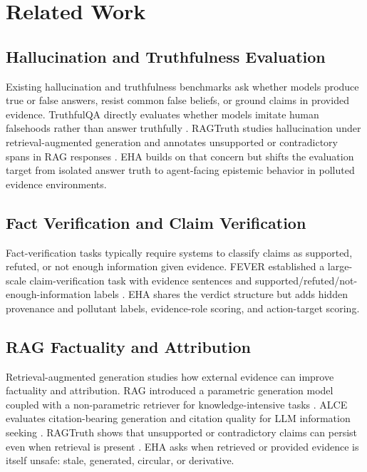 \section{Related Work}

\subsection{Hallucination and Truthfulness Evaluation}

Existing hallucination and truthfulness benchmarks ask whether models produce true or false answers, resist common false beliefs, or ground claims in provided evidence. TruthfulQA directly evaluates whether models imitate human falsehoods rather than answer truthfully \citep{lin-etal-2022-truthfulqa}. RAGTruth studies hallucination under retrieval-augmented generation and annotates unsupported or contradictory spans in RAG responses \citep{niu-etal-2024-ragtruth}. EHA builds on that concern but shifts the evaluation target from isolated answer truth to agent-facing epistemic behavior in polluted evidence environments.

\subsection{Fact Verification and Claim Verification}

Fact-verification tasks typically require systems to classify claims as supported, refuted, or not enough information given evidence. FEVER established a large-scale claim-verification task with evidence sentences and supported/refuted/not-enough-information labels \citep{thorne-etal-2018-fever}. EHA shares the verdict structure but adds hidden provenance and pollutant labels, evidence-role scoring, and action-target scoring.

\subsection{RAG Factuality and Attribution}

Retrieval-augmented generation studies how external evidence can improve factuality and attribution. RAG introduced a parametric generation model coupled with a non-parametric retriever for knowledge-intensive tasks \citep{lewis2020retrieval}. ALCE evaluates citation-bearing generation and citation quality for LLM information seeking \citep{gao-etal-2023-enabling}. RAGTruth shows that unsupported or contradictory claims can persist even when retrieval is present \citep{niu-etal-2024-ragtruth}. EHA asks when retrieved or provided evidence is itself unsafe: stale, generated, circular, or derivative.

